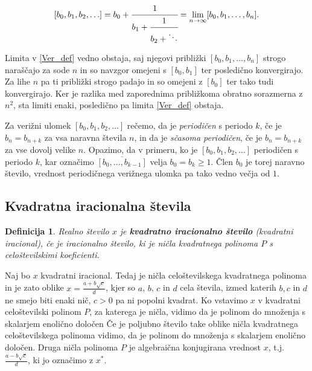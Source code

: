 \documentclass[a4paper,12pt]{article}
\newtheorem{definicija}{Definicija}
\begin{document}
\begin{equation}
\label{Ver_def}
    [b_0, b_1, b_2, \ldots] = b_0 + \cfrac{1}{b_1 + \cfrac{1}{b_2 + \ddots}} = \lim_{n \to \infty} [b_0, b_1, \ldots, b_n].
\end{equation}

Limita v \eqref{Ver_def} vedno obstaja, saj njegovi približki $[b_0, b_1, \ldots, b_n]$ strogo naraščajo za sode $n$ in so navzgor omejeni s $[b_0, b_1]$ ter posledično konvergirajo. Za lihe $n$ pa ti približki strogo padajo in so omejeni z $[b_0]$ ter tako tudi konvergirajo. Ker je razlika med zaporednima približkoma obratno sorazmerna z $n^2$, sta limiti enaki, posledično pa limita \eqref{Ver_def} obstaja. 

Za verižni ulomek $[b_0, b_1, b_2, \ldots]$ rečemo, da je \emph{periodičen} s periodo $k$, če je $b_n = b_{n+k}$ za vsa naravna števila $n$, in da je \emph{sčasoma periodičen}, če je $b_n = b_{n+k}$ za vse dovolj velike $n$. Opazimo, da v primeru, ko je $[b_0, b_1, b_2, \ldots]$ periodičen s periodo $k$, kar označimo $\overline{[b_0, \ldots, b_{k-1}]}$ velja $b_0 = b_k \geq 1$. Člen $b_0$ je torej naravno število, vrednost periodičnega verižnega ulomka pa tako vedno večja od $1$. 

\subsection{Kvadratna iracionalna števila}

\begin{definicija}
	Realno število $x$ je \textbf{kvadratno iracionalno število} (kvadratni iracional), če je iracionalno število, ki je ničla kvadratnega polinoma $P$ s celoštevilskimi koeficienti.
\end{definicija}
Naj bo $x$ kvadratni iracional. Tedaj je ničla celoštevilskega kvadratnega polinoma in je zato oblike $x = \frac{a + b\sqrt{c}}{d}$, kjer so $a$, $b$, $c$ in $d$ cela števila, izmed katerih $b, c$ in $d$ ne smejo biti enaki nič, $c > 0$ pa ni popolni kvadrat. Ko vstavimo $x$ v kvadratni celoštevilski polinom $P$, za katerega je ničla, vidimo da je polinom do množenja s skalarjem enolično določen
Če je poljubno število take oblike ničla kvadratnega celoštevilskega polinoma vidimo, da je polinom do množenja s skalarjem enolično določen. Druga ničla polinoma $P$ je algebraična konjugirana vrednost $x$, t.j. $\frac{a - b\sqrt{c}}{d}$, ki jo označimo z $x^*$.
\end{document}
